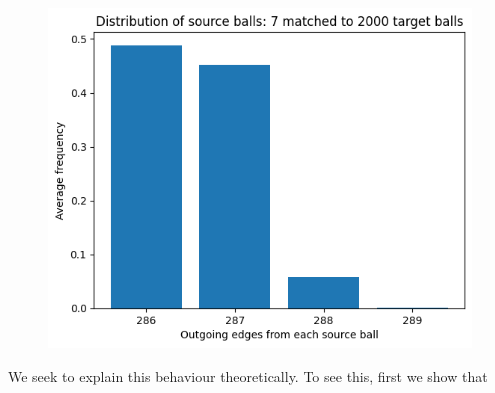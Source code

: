 \documentclass[12pt]{article}%
\theoremstyle{plain}
\begin{document}
\begin{figure}
  \centering
  \hspace*{0cm}\includegraphics[width=1\textwidth,height=\textwidth,keepaspectratio]{images/7-2000.png}
  \caption{}
  \label{fig: B}
\end{figure}

We seek to explain this behaviour theoretically. To see this, first we show that







\end{document}
